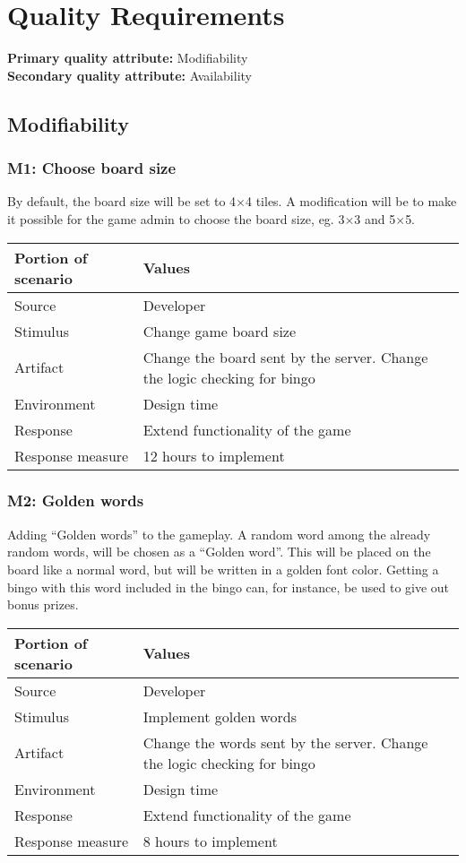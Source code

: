 \section{Quality Requirements}

{\bf Primary quality attribute: } Modifiability\\
{\bf Secondary quality attribute: } Availability

\subsection{Modifiability}

\subsubsection*{M1: Choose board size}
By default, the board size will be set to 4$\times$4 tiles.
A modification will be to make it possible for the game admin to choose the
board size, eg. 3$\times$3 and 5$\times$5.

\begin{tabular}{|m{}|m{}|}
\hline
{\bf Portion of scenario} & {\bf Values} \\ \hline
Source & Developer \\ \hline
Stimulus & Change game board size \\ \hline
Artifact & Change the board sent by the server. Change the logic
checking for bingo \\ \hline
Environment & Design time \\ \hline
Response & Extend functionality of the game \\ \hline
Response measure & 12 hours to implement \\ \hline
\end{tabular}
\newline

\subsubsection*{M2: Golden words}
Adding ``Golden words'' to the gameplay. A random word among the already random
words, will be chosen as a ``Golden word''. This will be placed on the board
like a normal word, but will be written in a golden font color. Getting a bingo
with this word included in the bingo can, for instance, be used to give out
bonus prizes.

\begin{tabular}{|m{}|m{}|}
\hline
{\bf Portion of scenario} & {\bf Values} \\ \hline
Source & Developer \\ \hline
Stimulus & Implement golden words \\ \hline
Artifact & Change the words sent by the server. Change the logic
checking for bingo \\ \hline
Environment & Design time \\ \hline
Response & Extend functionality of the game \\ \hline
Response measure & 8 hours to implement \\ \hline
\end{tabular}

